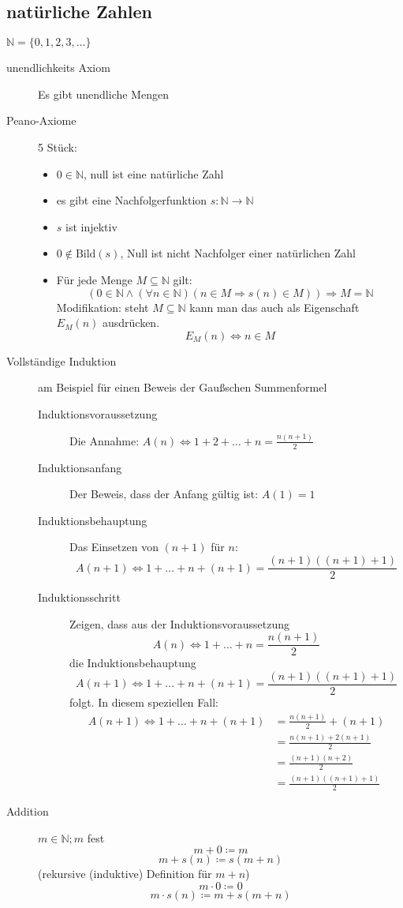 \documentclass[12pt,a4paper]{article}
\begin{document}
\subsection{natürliche Zahlen}
	$\mathbb{N} = \lbrace 0, 1, 2, 3, \dots \rbrace$
	\begin{description}
		\item[unendlichkeits Axiom] Es gibt unendliche Mengen
		\item[Peano-Axiome] 5 Stück:
			\begin{itemize}
				\item $0 \in \mathbb{N}$, null ist eine natürliche Zahl
				\item es gibt eine Nachfolgerfunktion $s : \mathbb{N} \longrightarrow \mathbb{N}$
				\item $s$ ist injektiv
				\item $0 \not \in \textrm{Bild}(s)$, Null ist nicht Nachfolger einer natürlichen Zahl
				\item Für jede Menge $M \subseteq \mathbb{N}$ gilt:
				$$(0 \in \mathbb{N} \wedge (\forall n \in \mathbb{N})(n \in M \Rightarrow s(n) \in M)) \Rightarrow M = \mathbb{N}$$
				Modifikation: steht $M \subseteq \mathbb{N}$ kann man das auch als Eigenschaft $E_M(n)$ ausdrücken.
				$$E_M(n) \Leftrightarrow n \in M$$
			\end{itemize}
		\item[Vollständige Induktion] am Beispiel für einen Beweis der Gaußschen Summenformel
			\begin{description}
				\item[Induktionsvoraussetzung] Die Annahme: $A(n) \Leftrightarrow 1 + 2 + \dots + n = \frac{n(n+1)}{2}$
				\item[Induktionsanfang] Der Beweis, dass der Anfang gültig ist: $A(1) = 1$
				\item[Induktionsbehauptung] Das Einsetzen von $(n + 1)$ für $n$:
					$$A(n + 1) \Leftrightarrow 1 + \dots + n + (n + 1)= \frac{(n + 1)((n + 1)+1)}{2}$$
				\item[Induktionsschritt] Zeigen, dass aus der Induktionsvoraussetzung
					$$A(n) \Leftrightarrow 1 + \dots + n = \frac{n(n+1)}{2}$$
					die Induktionsbehauptung
					$$A(n + 1) \Leftrightarrow 1 + \dots + n + (n + 1) = \frac{(n + 1)((n + 1)+1)}{2}$$
					folgt. In diesem speziellen Fall:
					\begin{align*}
						A(n + 1) \Leftrightarrow 1 + \dots + n + (n + 1) &= \frac{n(n + 1)}{2} + (n + 1) \\
						&= \frac{n(n + 1) + 2(n + 1)}{2} \\
						&= \frac{(n + 1)(n + 2)}{2} \\
						&= \frac{(n + 1)((n + 1)+1)}{2}
					\end{align*}
			\end{description}
		\item[Addition] $m \in \mathbb{N}; m$ fest
			$$m+0\coloneqq m$$
			$$m + s(n) \coloneqq s(m + n)$$
			(rekursive (induktive) Definition für $m + n$)
			$$m \cdot 0\coloneqq 0$$
			$$m \cdot s(n) \coloneqq m + s(m + n)$$
	\end{description}
\end{document}
